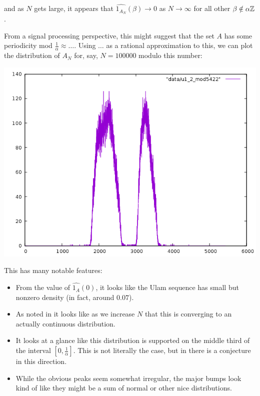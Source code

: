 \documentclass{article}
\theoremstyle{definition}
\theoremstyle{remark}
\numberwithin{equation}{section}
\begin{document}
and as $N$ gets large, it appears that
$\widehat{1_{A_N}}(\beta) \to 0$ as $N \to \infty$ for all other
$\beta \notin \alpha\mathbb{Z}$.

From a signal processing perspective, this might suggest that the set
$A$ has some periodicity mod $\frac 1 \alpha \approx \ldots$.  Using
$\ldots$ as a rational approximation to this, we can plot the
distribution of $A_N$ for, say, $N = 100000$ modulo this number: 

\includegraphics[scale=0.5]{../figs/u1_2_mod5422.png}

This has many notable features: 

\begin{itemize}
\item From the value of $\widehat{1_A}(0)$, it looks like the Ulam
  sequence has small but nonzero density (in fact, around $0.07$).

\item As noted in \cite{ulam_steinerberger} it looks like as we increase $N$
  that this is converging to an actually continuous distribution.

\item It looks at a glance like this distribution is supported on the
  middle third of the interval $[0,\frac1\alpha]$.  This is not
  literally the case, but in \cite{avoid_zero_gibbs} there is a
  conjecture in this direction.

\item While the obvious peaks seem somewhat irregular, the major bumps
  look kind of like they might be a sum of normal or other nice
  distributions.
\end{itemize}
\end{document}
